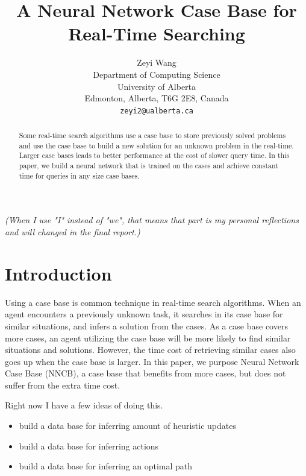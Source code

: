 \documentclass[letterpaper]{article}
\title{A Neural Network Case Base for Real-Time Searching}
\author{Zeyi Wang \\
    Department of Computing Science \\ University of Alberta \\
    Edmonton, Alberta, T6G 2E8, Canada \\
    {\texttt{zeyi2@ualberta.ca} }}
\numberwithin{equation}{section}
\numberwithin{theorem}{section}
\numberwithin{lemma}{section}
\numberwithin{df}{section}
\begin{document}
    \maketitle

    \textit{(When I use "I" instead of "we", that means that part is my personal reflections and will changed in the final report.)}

    \begin{abstract}
        Some real-time search algorithms use a case base to store previously solved problems and use the case base to build a new solution for an unknown problem in the real-time.
        Larger case bases leads to better performance at the cost of slower query time.
        In this paper, we build a neural network that is trained on the cases and achieve
        constant time for queries in any size case bases.

    \end{abstract}


    \section{Introduction}\label{sec:introduction}


    Using a case base is common technique in real-time search algorithms.
    When an agent encounters a previously unknown task, it searches in its case base for similar situations, and infers a solution from the cases.
    As a case base covers more cases, an agent utilizing the case base will be more likely to find similar situations and solutions.
    However, the time cost of retrieving similar cases also goes up when the case base is larger.
    In this paper, we purpose Neural Network Case Base (NNCB), a case base that benefits from more cases, but does not suffer from the extra time cost.

    Right now I have a few ideas of doing this.
    \begin{itemize}
        \item build a data base for inferring amount of heuristic updates
        \item build a data base for inferring actions
        \item build a data base for inferring an optimal path
    \end{itemize}
\end{document}
